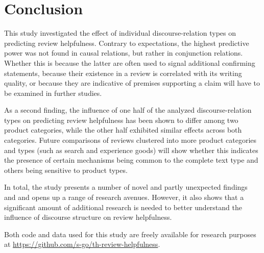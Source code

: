 \documentclass[
    a4paper,%
    12pt,%
    oneside,%
    toc=bibliography,
    final,
]{scrartcl}
\begin{document}
\section{Conclusion}
\label{sec:conclusion}

This study investigated the effect of individual discourse-relation types on predicting review helpfulness. Contrary to expectations, the highest predictive power was not found in causal relations, but rather in conjunction relations. Whether this is because the latter are often used to signal additional confirming statements, because their existence in a review is correlated with its writing quality, or because they are indicative of premises supporting a claim will have to be examined in further studies.

As a second finding, the influence of one half of the analyzed discourse-relation types on predicting review helpfulness has been shown to differ among two product categories, while the other half exhibited similar effects across both categories. Future comparisons of reviews clustered into more product categories and types (such as search and experience goods) will show whether this indicates the presence of certain mechanisms being common to the complete text type and others being sensitive to product types.

In total, the study presents a number of novel and partly unexpected findings and and opens up a range of research avenues. However, it also shows that a significant amount of additional research is needed to better understand the influence of discourse structure on review helpfulness.

\vfill


\begin{center}
Both code and data used for this study are freely available for research purposes at \url{https://github.com/s-go/th-review-helpfulness}.
\end{center}
\end{document}
